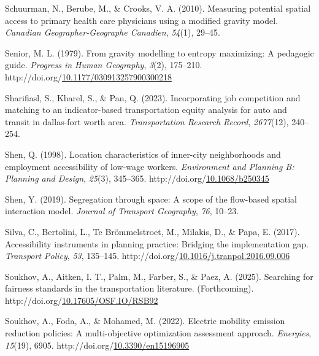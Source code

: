 \documentclass[
11pt, %
oneside, %
english, %
singlespacing, %
]{macthesis} %
\newlength{\cslhangindent}
\newenvironment{CSLReferences}[2] %
{\begin{list}{}{%
	\setlength{\itemindent}{0pt}
	\setlength{\leftmargin}{0pt}
	\setlength{\parsep}{0pt}
	\ifodd #1
	\setlength{\leftmargin}{\cslhangindent}
	\setlength{\itemindent}{-1\cslhangindent}
	\fi
	\setlength{\itemsep}{#2\baselineskip}}}
{\end{list}}
\begin{document}
\begin{CSLReferences}{1}{0}
Schuurman, N., Berube, M., \& Crooks, V. A. (2010). Measuring potential spatial access to primary health care physicians using a modified gravity model. \emph{Canadian Geographer-Geographe Canadien}, \emph{54}(1), 29--45.

Senior, M. L. (1979). From gravity modelling to entropy maximizing: A pedagogic guide. \emph{Progress in Human Geography}, \emph{3}(2), 175--210. http://doi.org/\href{https://doi.org/10.1177/030913257900300218}{10.1177/030913257900300218}

Sharifiasl, S., Kharel, S., \& Pan, Q. (2023). Incorporating job competition and matching to an indicator-based transportation equity analysis for auto and transit in dallas-fort worth area. \emph{Transportation Research Record}, \emph{2677}(12), 240--254.

Shen, Q. (1998). Location characteristics of inner-city neighborhoods and employment accessibility of low-wage workers. \emph{Environment and Planning B: Planning and Design}, \emph{25}(3), 345--365. http://doi.org/\href{https://doi.org/10.1068/b250345}{10.1068/b250345}

Shen, Y. (2019). Segregation through space: A scope of the flow-based spatial interaction model. \emph{Journal of Transport Geography}, \emph{76}, 10--23.

Silva, C., Bertolini, L., Te Brömmelstroet, M., Milakis, D., \& Papa, E. (2017). Accessibility instruments in planning practice: Bridging the implementation gap. \emph{Transport Policy}, \emph{53}, 135--145. http://doi.org/\href{https://doi.org/10.1016/j.tranpol.2016.09.006}{10.1016/j.tranpol.2016.09.006}

Soukhov, A., Aitken, I. T., Palm, M., Farber, S., \& Paez, A. (2025). Searching for fairness standards in the transportation literature. (Forthcoming). http://doi.org/\href{https://doi.org/10.17605/OSF.IO/RSB92}{10.17605/OSF.IO/RSB92}

Soukhov, A., Foda, A., \& Mohamed, M. (2022). Electric mobility emission reduction policies: A multi-objective optimization assessment approach. \emph{Energies}, \emph{15}(19), 6905. http://doi.org/\href{https://doi.org/10.3390/en15196905}{10.3390/en15196905}


\end{CSLReferences}
\end{document}
